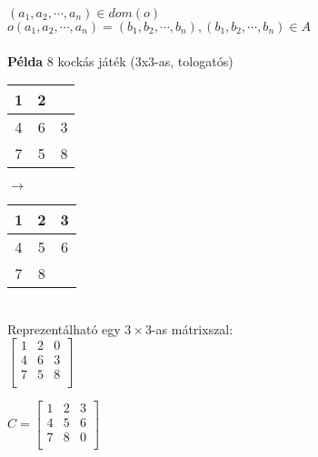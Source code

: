 \documentclass[a4paper, 12pt, fullpage]{article}
\begin{document}
    $(a_1, a_2, \cdots, a_n) \in dom(o)$\\
    $o(a_1, a_2, \cdots, a_n) = (b_1, b_2, \cdots, b_n), (b_1, b_2, \cdots, b_n) \in A$\\ \\
    \large\textbf{Példa} 8 kockás játék (3x3-as, tologatós)\\
    \begin{tabular}{|c|c|c|}
        \hline
        1 & 2 & \\
        \hline
        4 & 6 & 3 \\
        \hline
        7 & 5 & 8\\
        \hline
    \end{tabular}
    $\longrightarrow$
    \begin{tabular}{|c|c|c|}
        \hline
        1 & 2 & 3\\
        \hline
        4 & 5 &6 \\
        \hline
        7 & 8 & \\
        \hline
    \end{tabular}\\
    Reprezentálható egy $3 \times 3$-as mátrixszal:\\
    $\begin{bmatrix}
        1 & 2 & 0\\
        4 & 6 & 3 \\
        7 & 5 & 8\\
    \end{bmatrix}$
    
        $C = \begin{bmatrix}
            1 & 2 & 3\\
            4 & 5 & 6\\
            7 & 8 & 0\\
        \end{bmatrix}$
\end{document}
